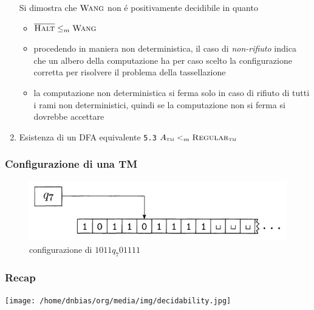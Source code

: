 \documentclass[11pt]{article}
\begin{document}
\begin{enumerate}
Si dimostra che \(\textsc{Wang}\) non é positivamente decidibile in quanto
\begin{itemize}
\item \(\overline{\textsc{Halt}} \le_m \textsc{Wang}\)
\item procedendo in maniera non deterministica, il caso di \emph{non-rifiuto} indica che un albero della computazione ha per caso scelto la configurazione corretta per risolvere il problema della tassellazione
\item la computazione non deterministica si ferma solo in caso di rifiuto di tutti i rami non deterministici, quindi se la computazione non si ferma si dovrebbe accettare
\end{itemize}

\item Esistenza di un DFA equivalente
\label{sec:orgf1b5748}
\texttt{5.3}
\(A_{\textsc{tm}} <_m\textsc{Regular}_{\textsc{tm}}\)
\end{enumerate}
\subsubsection{Configurazione di una TM}
\label{sec:org3e025da}
\begin{figure}[htbp]
\centering
\includegraphics[width=.9\linewidth]{../media/img/tm-configuration.jpg}
\caption{configurazione di \(1011 q_{7} 01111\)}
\end{figure}
\subsubsection{Recap}
\label{sec:org5ddd329}
\begin{center}
\texttt{[image: /home/dnbias/org/media/img/decidability.jpg]}
\end{center}
\end{document}
